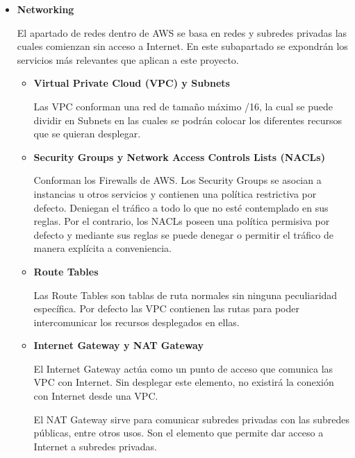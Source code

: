 \documentclass[../../memoria.tex]{subfiles}
\begin{document}
\begin{itemize}
      \item \textbf{Networking}
            \par
            El apartado de redes dentro de AWS se basa en redes y subredes privadas las cuales comienzan sin acceso a Internet. En este subapartado se expondrán los servicios más relevantes que aplican a este proyecto.
            \begin{itemize}
                  \item \textbf{Virtual Private Cloud (VPC) y Subnets}
                        \par
                        Las VPC conforman una red de tamaño máximo /16, la cual se puede dividir en Subnets en las cuales se podrán colocar los diferentes recursos que se quieran desplegar.
                  \item \textbf{Security Groups y Network Access Controls Lists (NACLs)}
                        \par
                        Conforman los Firewalls de AWS. Los Security Groups se asocian a instancias u otros servicios y contienen una política restrictiva por defecto. Deniegan el tráfico a todo lo que no esté contemplado en sus reglas. Por el contrario, los NACLs poseen una política permisiva por defecto y mediante sus reglas se puede denegar o permitir el tráfico de manera explícita a conveniencia.
                  \item \textbf{Route Tables }
                        \par
                        Las Route Tables son tablas de ruta normales sin ninguna peculiaridad específica. Por defecto las VPC contienen las rutas para poder intercomunicar los recursos desplegados en ellas.
                  \item \textbf{Internet Gateway y NAT Gateway }
                        \par
                        El Internet Gateway actúa como un punto de acceso que comunica las VPC con Internet. Sin desplegar este elemento, no existirá la conexión con Internet desde una VPC.

                        El NAT Gateway sirve para comunicar subredes privadas con las subredes públicas, entre otros usos. Son el elemento que permite dar acceso a Internet a subredes privadas.
            \end{itemize}


\end{itemize}
\end{document}
